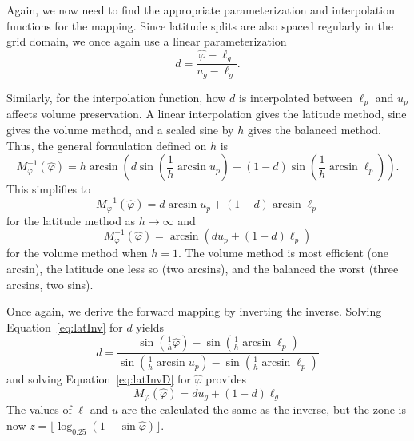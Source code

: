Again, we now need to find the appropriate parameterization and interpolation functions for the mapping.
Since latitude splits are also spaced regularly in the grid domain, we once again use a linear parameterization
%
\begin{equation} \label{eq:latInvD}
d = \frac{ \hat{\varphi} - \ell_g }{ u_g - \ell_g }.
\end{equation}
%

Similarly, for the interpolation function, how $d$ is interpolated between $\ell_p$ and $u_p$ affects volume preservation.
A linear interpolation gives the latitude method, sine gives the volume method, and a scaled sine by $h$ gives the balanced method.
Thus, the general formulation defined on $h$ is
%
\begin{equation} \label{eq:latInv}
M_\varphi^{-1}(\hat{\varphi}) = h \arcsin \left( d \sin \left( \frac{1}{h} \arcsin u_p \right) + \left( 1 - d \right) \sin \left( \frac{1}{h} \arcsin \ell_p \right) \right).
\end{equation}
%
This simplifies to
%
\begin{equation*}
M_\varphi^{-1}(\hat{\varphi}) = d \arcsin u_p  + \left( 1 - d \right) \arcsin \ell_p
\end{equation*}
%
for the latitude method as $h \rightarrow \infty$ and
%
\begin{equation*}
M_\varphi^{-1}(\hat{\varphi}) = \arcsin \left( d u_p + \left( 1 - d \right) \ell_p \right)
\end{equation*}
%
for the volume method when $h = 1$.
The volume method is most efficient (one arcsin), the latitude one less so (two arcsins), and the balanced the worst (three arcsins, two sins).


Once again, we derive the forward mapping by inverting the inverse.
Solving Equation~\ref{eq:latInv} for $d$ yields
%
\begin{equation} \label{latForwD}
d = \frac{ \sin \left( \frac{1}{h} \hat{\varphi} \right) - \sin \left( \frac{1}{h} \arcsin \ell_p \right) }{ \sin \left( \frac{1}{h} \arcsin u_p \right) - \sin \left( \frac{1}{h} \arcsin \ell_p \right) }
\end{equation}
%
and solving Equation~\ref{eq:latInvD} for $\hat{\varphi}$ provides
%
\begin{equation} \label{eq:latForw}
M_\varphi (\hat{\varphi}) = d u_g + \left( 1 - d \right) \ell_g
\end{equation}
%
The values of $\ell$ and $u$ are the calculated the same as the inverse, but the zone is now $z = \lfloor \log_{0.25} ( 1 - \sin \hat{\varphi} ) \rfloor$.


